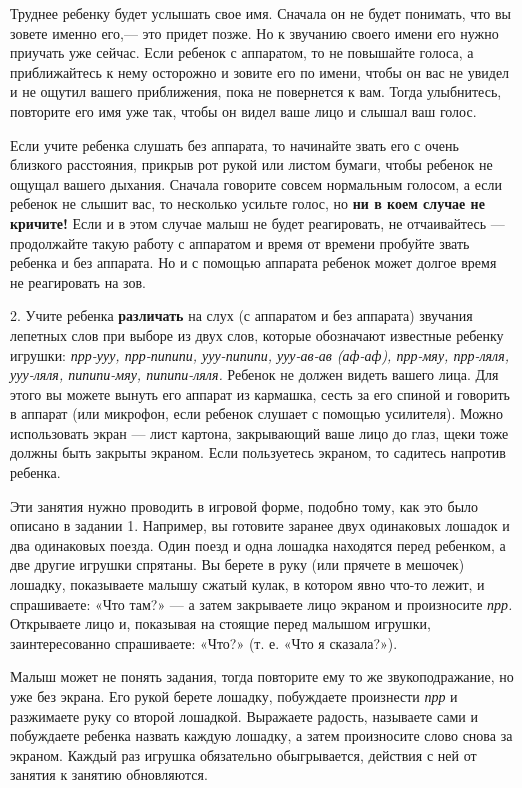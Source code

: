\documentclass[a5paper]{book}
\renewcommand{\emph}[1]{\textit{#1}}
\begin{document}
Труднее ребенку будет услышать свое имя. Сначала он не будет понимать,
что вы зовете именно его,--- это придет позже. Но к звучанию своего
имени его нужно приучать уже сейчас. Если ребенок с аппаратом, то не
повышайте голоса, а приближайтесь к нему осторожно и зовите его по
имени, чтобы он вас не увидел и не ощутил вашего приближения, пока не
повернется к вам. Тогда улыбнитесь, повторите его имя уже так, чтобы он
видел ваше лицо и слышал ваш голос.

Если учите ребенка слушать без аппарата, то начинайте звать его с очень
близкого расстояния, прикрыв рот рукой или листом бумаги, чтобы ребенок
не ощущал вашего дыхания. Сначала говорите совсем нормальным голосом, а
если ребенок не слышит вас, то несколько усильте голос, но \textbf{ни в
коем случае не кричите!} Если и в этом случае малыш не будет
реагировать, не отчаивайтесь --- продолжайте такую работу с аппаратом и
время от времени пробуйте звать ребенка и без аппарата. Но и с помощью
аппарата ребенок может долгое время не реагировать на зов.

2. Учите ребенка \textbf{различать} на слух (с аппаратом и без аппарата)
звучания лепетных слов при выборе из двух слов, которые обозначают
известные ребенку игрушки: \emph{прр-ууу, прр-пипипи, ууу-пипипи,
ууу-ав-ав (аф-аф), прр-мяу, прр-ляля, ууу-ляля, пипипи-мяу,
пипипи-ляля.} Ребенок не должен видеть вашего лица. Для этого вы можете
вынуть его аппарат из кармашка, сесть за его спиной и говорить в аппарат
(или микрофон, если ребенок слушает с помощью усилителя). Можно
использовать экран --- лист картона, закрывающий ваше лицо до глаз, щеки
тоже должны быть закрыты экраном. Если пользуетесь экраном, то садитесь
напротив ребенка.

Эти занятия нужно проводить в игровой форме, подобно тому, как это было
описано в задании 1. Например, вы готовите заранее двух одинаковых
лошадок и два одинаковых поезда. Один поезд и одна лошадка находятся
перед ребенком, а две другие игрушки спрятаны. Вы берете в руку (или
прячете в мешочек) лошадку, показываете малышу сжатый кулак, в котором
явно что-то лежит, и спрашиваете: «Что там?» --- а затем закрываете лицо
экраном и произносите \emph{прр.} Открываете лицо и, показывая на
стоящие перед малышом игрушки, заинтересованно спрашиваете: «Что?» (т.
е. «Что я сказала?»).

Малыш может не понять задания, тогда повторите ему то же
звукоподражание, но уже без экрана. Его рукой берете лошадку, побуждаете
произнести \emph{прр} и разжимаете руку со второй лошадкой. Выражаете
радость, называете сами и побуждаете ребенка назвать каждую лошадку, а
затем произносите слово снова за экраном. Каждый раз игрушка обязательно
обыгрывается, действия с ней от занятия к занятию обновляются.
\end{document}

